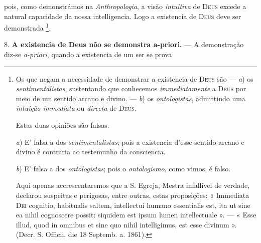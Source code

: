  pois, como demonstrámos na \emph{Anthropologia}, a visão \emph{intuitiva} de \textsc{Deus} excede a natural capacidade da nossa intelligencia. Logo a existencia de \textsc{Deus} deve ser demonstrada \footnote{Os que negam a necessidade de demonstrar a existencia de \textsc{Deus} são --- \emph{a}) os \emph{sentimentalistas}, sustentando que conhecemos \emph{immediatamente} a \textsc{Deus} por meio de um sentido arcano e divino. --- \emph{b}) os \emph{ontologistas}, admittindo uma \emph{intuição immediata} ou \emph{directa} de \textsc{Deus}.\par Estas duas opiniões são falsas.\par \emph{a}) E' falsa a dos \emph{sentimentalistas}; pois a existencia d'esse sentido arcano e divino é contraria ao testemunho da consciencia.\par \emph{b}) E' falsa a dos \emph{ontologistas}; pois o \emph{ontologismo}, como vimos, é falso.\par Aqui apenas accrescentaremos que a S. Egreja, Mestra infallivel de verdade, declarou suspeitas e perigosas, entre outras, estas proposições: « Immediata \textsc{Dei} cognitio, habitualis saltem, intellectui humano essentialis est, ita ut sine ea nihil cognoscere possit: siquidem est ipsum lumen intellectuale ». --- « Esse illud, quod in omnibus et sine quo nihil intelligimus, est esse divinum ». (Decr. S. Officii, die 18 Septemb. a. 1861).}.

8. \textbf{A existencia de Deus não se demonstra a-priori.} --- A demonstração diz-se \emph{a-priori}, quando a existencia de um ser se prova
